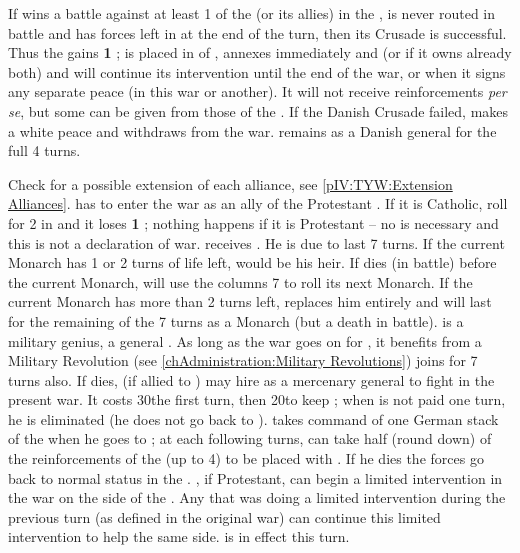 \bparag If \DANdan wins a battle against at least 1 \ARMY\faceplus of the
\ligue (or its allies) in the \HRE, is never routed in battle and has forces
left in \HRE at the end of the turn, then its Crusade is successful.
\bparag Thus the \alliance gains {\bf 1} \STAB ; \DANmin is placed in \EG of
\ENG, annexes immediately \provinceLubeck and \provinceHolstein (or
\provinceMecklenburg if it owns already both) and will continue its
intervention until the end of the war, or when it signs any separate peace (in
this war or another). It will not receive reinforcements \emph{per se}, but
some can be given from those of the \alliance.
\bparag If the Danish Crusade failed, \DANmin makes a white peace and
withdraws from the war.  remains as a Danish general for
the full 4 turns.


\phevnt
\aparag Check for a possible extension of each alliance, see
\ref{pIV:TYW:Extension Alliances}.
\aparag \SUE has to enter the war as an ally of the Protestant \alliance.  If
it is Catholic, roll for 2 \REVOLT in \SUE and it loses {\bf 1} \STAB ;
nothing happens if it is Protestant -- no \CB is necessary and this is not a
declaration of war.
 \SUE receives . He is
due to last 7 turns.
\bparag If the current Monarch has 1 or 2 turns of life left,
 would be his heir. If 
dies (in battle) before the current Monarch, \SUE will use the columns 7 to
roll its next Monarch.
\bparag If the current Monarch has more than 2 turns left,  replaces him entirely and will last for the remaining of the 7
turns as a Monarch (but a death in battle).
\bparag {} is a military genius, a general
. As long as the war goes on for \SUE, it
benefits from a Military Revolution (see \ref{chAdministration:Military
  Revolutions})
\label{pIV:TYW:Saxe-Weimar}
 joins \SUE for 7 turns also.
\bparag If  dies, \FRA (if allied to \SUE) may hire
 as a mercenary general to fight in the present war.  It
costs 30\ducats the first turn, then 20\ducats to keep ;
when  is not paid one turn, he is eliminated (he does not
go back to \SUE).  takes command of one German stack of
the \alliance when he goes to \FRA; at each following turns, \FRA can take
half (round down) of the reinforcements of the \alliance (up to 4\LD) to be
placed with .  If he dies the forces go back to normal
status in the \alliance.
\aparag \FRA, if Protestant, can begin a limited intervention in the war on
the side of the \alliance.
\aparag Any \MAJ that was doing a limited intervention during the previous
turn (as defined in the original war) can continue this limited intervention
to help the same side.
\aparag {} is in effect this turn.

